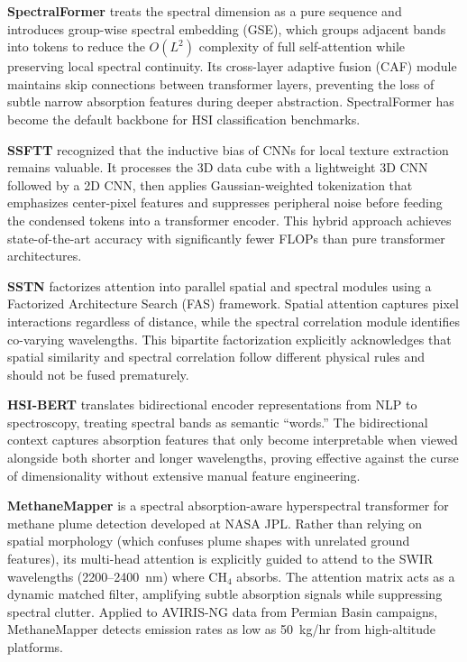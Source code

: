 \documentclass[11pt]{report}
\begin{document}
\textbf{SpectralFormer} \cite{hong2021spectralformer} treats the spectral dimension as a pure sequence and introduces group-wise spectral embedding (GSE), which groups adjacent bands into tokens to reduce the $O(L^2)$ complexity of full self-attention while preserving local spectral continuity. Its cross-layer adaptive fusion (CAF) module maintains skip connections between transformer layers, preventing the loss of subtle narrow absorption features during deeper abstraction. SpectralFormer has become the default backbone for HSI classification benchmarks.

\textbf{SSFTT} \cite{sun2022ssftt} recognized that the inductive bias of CNNs for local texture extraction remains valuable. It processes the 3D data cube with a lightweight 3D CNN followed by a 2D CNN, then applies Gaussian-weighted tokenization that emphasizes center-pixel features and suppresses peripheral noise before feeding the condensed tokens into a transformer encoder. This hybrid approach achieves state-of-the-art accuracy with significantly fewer FLOPs than pure transformer architectures.

\textbf{SSTN} \cite{zhong2021sstn} factorizes attention into parallel spatial and spectral modules using a Factorized Architecture Search (FAS) framework. Spatial attention captures pixel interactions regardless of distance, while the spectral correlation module identifies co-varying wavelengths. This bipartite factorization explicitly acknowledges that spatial similarity and spectral correlation follow different physical rules and should not be fused prematurely.

\textbf{HSI-BERT} \cite{he2020hsibert} translates bidirectional encoder representations from NLP to spectroscopy, treating spectral bands as semantic ``words.'' The bidirectional context captures absorption features that only become interpretable when viewed alongside both shorter and longer wavelengths, proving effective against the curse of dimensionality without extensive manual feature engineering.

\textbf{MethaneMapper} \cite{kumar2023methanemapper} is a spectral absorption-aware hyperspectral transformer for methane plume detection developed at NASA JPL. Rather than relying on spatial morphology (which confuses plume shapes with unrelated ground features), its multi-head attention is explicitly guided to attend to the SWIR wavelengths (2200--2400~nm) where CH$_4$ absorbs. The attention matrix acts as a dynamic matched filter, amplifying subtle absorption signals while suppressing spectral clutter. Applied to AVIRIS-NG data from Permian Basin campaigns, MethaneMapper detects emission rates as low as 50~kg/hr from high-altitude platforms.
\end{document}
